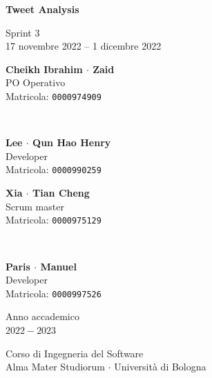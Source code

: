 \documentclass[11pt]{article}
\begin{document}
\begin{titlepage}
    \begin{center}
        \vspace*{1.5cm}
            
        \Huge
        \textbf{Tweet Analysis}
            
        \vspace{0.3cm}
        \LARGE
        Sprint 3\\[0.2em]
        \Large
        17 novembre 2022 -- 1 dicembre 2022

        \vspace{1.5cm}
          
        \begin{minipage}[t]{0.47\textwidth}
            \begin{center}
                \parbox{50mm}{\centering\large {\bf Cheikh Ibrahim $\cdot$ Zaid} \\[0.2em] PO Operativo \\[0.3em] Matricola: \texttt{0000974909}}\\[2em]
                \parbox{50mm}{\centering\large {\bf Lee $\cdot$ Qun Hao Henry} \\[0.2em] Developer \\[0.3em] Matricola: \texttt{0000990259}}
            \end{center}
		\end{minipage}
		\hfill
		\begin{minipage}[t]{0.47\textwidth}\raggedleft
            \begin{center}
                \parbox{50mm}{\centering\large {\bf Xia $\cdot$ Tian Cheng} \\[0.2em] Scrum master \\[0.3em] Matricola: \texttt{0000975129}}\\[2em]
                \parbox{50mm}{\centering\large {\bf Paris $\cdot$ Manuel} \\[0.2em] Developer \\[0.3em] Matricola: \texttt{0000997526}}
            \end{center}
		\end{minipage}  
            
        \vspace{6cm}
            
        Anno accademico\\
        $2022 - 2023$
            
        \vspace{0.8cm}
            
            
        \Large
        Corso di Ingegneria del Software\\
        Alma Mater Studiorum $\cdot$ Università di Bologna\\
            
    \end{center}
\end{titlepage}
\pagebreak
\end{document}

